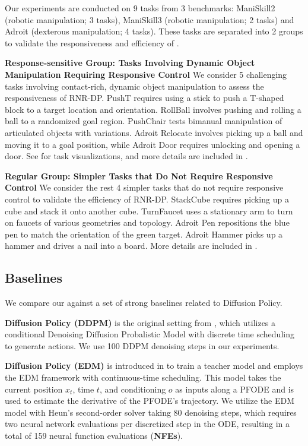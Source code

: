 Our experiments are conducted on 9 tasks from 3 benchmarks: ManiSkill2 (robotic manipulation; 3 tasks), ManiSkill3 (robotic manipulation; 2 tasks) and Adroit (dexterous manipulation; 4 tasks). These tasks are separated into 2 groups to validate the responsiveness and efficiency of \ourslong.

\textbf{Response-sensitive Group: Tasks Involving Dynamic Object Manipulation Requiring Responsive Control} 
We consider 5 challenging tasks involving contact-rich, dynamic object manipulation to assess the responsiveness of RNR-DP. PushT requires using a stick to push a T-shaped block to a target location and orientation. RollBall involves pushing and rolling a ball to a randomized goal region. PushChair tests bimanual manipulation of articulated objects with variations. Adroit Relocate involves picking up a ball and moving it to a goal position, while Adroit Door requires unlocking and opening a door. See  for task visualizations, and more details are included in .

\textbf{Regular Group: Simpler Tasks that Do Not Require Responsive Control}
We consider the rest 4 simpler tasks that do not require responsive control to validate the efficiency of RNR-DP. StackCube requires picking up a cube and stack it onto another cube. TurnFaucet uses a stationary arm to turn on faucets of various geometries and topology. Adroit Pen repositions the blue pen to match the orientation of the green target. Adroit Hammer picks up a hammer and drives a nail into a board. More details are included in .

\subsection{Baselines}

We compare our \ourslong against a set of strong baselines related to Diffusion Policy.

\textbf{Diffusion Policy (DDPM)} is the original setting from \citet{chi2023diffusion}, which utilizes a conditional Denoising Diffusion Probalistic Model with discrete time scheduling to generate actions. We use 100 DDPM denoising steps in our experiments.

\textbf{Diffusion Policy (EDM)} is introduced in \citet{prasad2024consistency} to train a teacher model and employs the EDM \citep{karras2022elucidating} framework with continuous-time scheduling. This model takes the current position \(x_t\), time \(t\), and conditioning \(o\) as inputs along a PFODE and is used to estimate the derivative of the PFODE's trajectory. We utilize the EDM model with Heun's second-order solver taking 80 denoising steps, which requires two neural network evaluations per discretized step in the ODE, resulting in a total of 159 neural function evaluations (\textbf{NFEs}).

